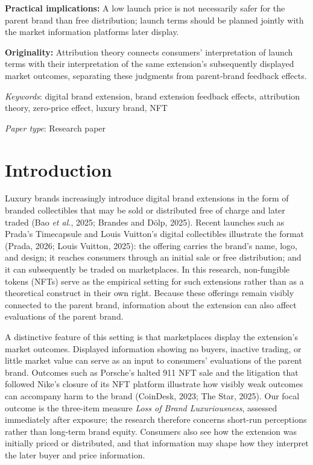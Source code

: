 \documentclass[12pt, a4paper]{article}
\begin{document}
\textbf{Practical implications:} A low launch price is not necessarily safer for the parent brand than free distribution; launch terms should be planned jointly with the market information platforms later display.

\textbf{Originality:} Attribution theory connects consumers' interpretation of launch terms with their interpretation of the same extension's subsequently displayed market outcomes, separating these judgments from parent-brand feedback effects.

\emph{Keywords}: digital brand extension, brand extension feedback effects, attribution theory, zero-price effect, luxury brand, NFT

\emph{Paper type}: Research paper

\newpage

\section{Introduction}

Luxury brands increasingly introduce digital brand extensions in the form of branded collectibles that may be sold or distributed free of charge and later traded (Bao \emph{et al.}, 2025; Brandes and D\"olp, 2025). Recent launches such as Prada's Timecapsule and Louis Vuitton's digital collectibles illustrate the format (Prada, 2026; Louis Vuitton, 2025): the offering carries the brand's name, logo, and design; it reaches consumers through an initial sale or free distribution; and it can subsequently be traded on marketplaces. In this research, non-fungible tokens (NFTs) serve as the empirical setting for such extensions rather than as a theoretical construct in their own right. Because these offerings remain visibly connected to the parent brand, information about the extension can also affect evaluations of the parent brand.

A distinctive feature of this setting is that marketplaces display the extension's market outcomes. Displayed information showing no buyers, inactive trading, or little market value can serve as an input to consumers' evaluations of the parent brand. Outcomes such as Porsche's halted 911 NFT sale and the litigation that followed Nike's closure of its NFT platform illustrate how visibly weak outcomes can accompany harm to the brand (CoinDesk, 2023; The Star, 2025). Our focal outcome is the three-item measure \emph{Loss of Brand Luxuriousness}, assessed immediately after exposure; the research therefore concerns short-run perceptions rather than long-term brand equity. Consumers also see how the extension was initially priced or distributed, and that information may shape how they interpret the later buyer and price information.
\end{document}
